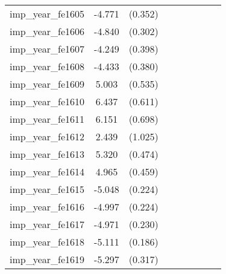 {\begin{tabular}{l*{4}{cc}}
imp\_year\_fe1605&   -4.771\sym{***}&  (0.352)&                  &         &                  &         &                  &         \\
imp\_year\_fe1606&   -4.840\sym{***}&  (0.302)&                  &         &                  &         &                  &         \\
imp\_year\_fe1607&   -4.249\sym{***}&  (0.398)&                  &         &                  &         &                  &         \\
imp\_year\_fe1608&   -4.433\sym{***}&  (0.380)&                  &         &                  &         &                  &         \\
imp\_year\_fe1609&    5.003\sym{***}&  (0.535)&                  &         &                  &         &                  &         \\
imp\_year\_fe1610&    6.437\sym{***}&  (0.611)&                  &         &                  &         &                  &         \\
imp\_year\_fe1611&    6.151\sym{***}&  (0.698)&                  &         &                  &         &                  &         \\
imp\_year\_fe1612&    2.439\sym{*}  &  (1.025)&                  &         &                  &         &                  &         \\
imp\_year\_fe1613&    5.320\sym{***}&  (0.474)&                  &         &                  &         &                  &         \\
imp\_year\_fe1614&    4.965\sym{***}&  (0.459)&                  &         &                  &         &                  &         \\
imp\_year\_fe1615&   -5.048\sym{***}&  (0.224)&                  &         &                  &         &                  &         \\
imp\_year\_fe1616&   -4.997\sym{***}&  (0.224)&                  &         &                  &         &                  &         \\
imp\_year\_fe1617&   -4.971\sym{***}&  (0.230)&                  &         &                  &         &                  &         \\
imp\_year\_fe1618&   -5.111\sym{***}&  (0.186)&                  &         &                  &         &                  &         \\
imp\_year\_fe1619&   -5.297\sym{***}&  (0.317)&                  &         &                  &         &                  &         \\

\end{tabular}}
